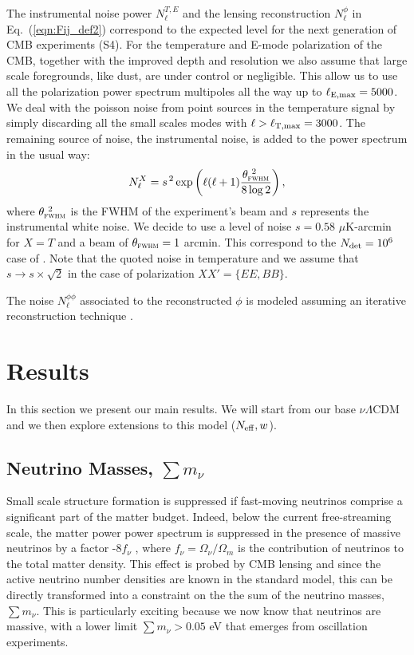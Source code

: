 \documentclass[aps,prd,reprint,superscriptaddress]{revtex4-1}
\newcommand\refeq[1]{Eq.~(\ref{eqn:#1})}
\begin{document}
The instrumental noise power $N_{\ell}^{T,E}$ and the lensing reconstruction $N_{\ell}^{\phi}$ in \refeq{Fij_def2} correspond to the expected level for the next generation of CMB experiments (S4).
For the temperature and E-mode polarization of the CMB, together with the improved depth and resolution we also assume that large scale foregrounds, like dust, are under control or negligible. This allow us to use all the polarization power spectrum multipoles all the way up to $\ell_{\rm E,max}=5000$. We deal with the poisson noise from point sources in the temperature signal by simply discarding all the small scales modes with $\ell>\ell_{\rm T,max}=3000$.
The remaining source of noise, the instrumental noise, is added to the power spectrum in the usual way:
 \begin{equation}
 	\centering
		N^{X}_\ell = s^{\, 2} \exp \left(\ell(\ell+1) \frac{\theta^{\ 2}_{\textsc{fwhm}}}{8\log2}\right),
	\label{eq:beamnoise}
\end{equation}
where $\theta^{\ 2}_{\textsc{fwhm}}$ is the FWHM of the experiment's beam and $s$ represents the instrumental white noise.
We decide to use a level of noise $s = 0.58$ $\mu$K-arcmin for $X=T$ and a beam of $\theta_{\textsc{fwhm}}=1$ arcmin. This correspond to the $N_{\rm det}=10^{6}$ case of \cite{wu:2014}. 
Note that the quoted noise in temperature and we assume that $s \rightarrow s\times \sqrt{2}$ in the case of polarization $ XX' = \{ EE, BB \}$.


The noise $N_\ell^{\phi\phi}$ associated to the reconstructed $\phi$ is modeled assuming an iterative reconstruction technique \cite{seljak:2004}. 


\section{Results \label{sec:results}}
In this section we present our main results. We will start from our base $\nu \Lambda$CDM and we then explore extensions to this model ($N_{\rm eff},w$).

\subsection{Neutrino Masses, $\sum m_\nu$}



Small scale structure formation is suppressed if fast-moving neutrinos comprise a significant part of the matter budget. 
Indeed, below the current free-streaming scale, the matter power power spectrum is suppressed in the presence of
massive neutrinos by a factor -8$f_{\nu}$ , where $f_{\nu} = \Omega_{\nu} / \Omega_{m}$ is the contribution of neutrinos to the total matter density.
This effect is probed by CMB lensing and since the active neutrino number densities are known in the standard model, this can be directly transformed into a constraint on the the sum of the neutrino masses, $\sum m_\nu$. This is particularly exciting because we now know that neutrinos are massive, with a lower limit  $\sum m_\nu>0.05$ eV that emerges from oscillation experiments. 
\end{document}
